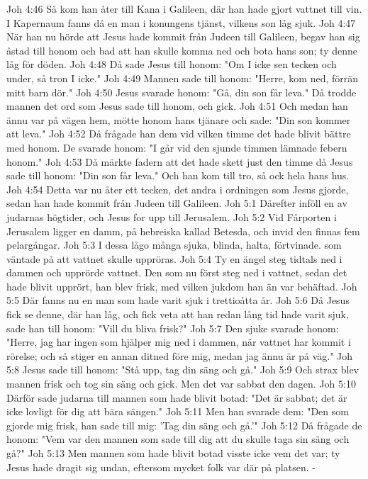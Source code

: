 Joh 4:46  Så kom han åter till Kana i Galileen, där han hade gjort vattnet till vin. I Kapernaum fanns då en man i konungens tjänst, vilkens son låg sjuk.
Joh 4:47  När han nu hörde att Jesus hade kommit från Judeen till Galileen, begav han sig åstad till honom och bad att han skulle komma ned och bota hans son; ty denne låg för döden.
Joh 4:48  Då sade Jesus till honom: "Om I icke sen tecken och under, så tron I icke."
Joh 4:49  Mannen sade till honom: "Herre, kom ned, förrän mitt barn dör."
Joh 4:50  Jesus svarade honom: "Gå, din son får leva." Då trodde mannen det ord som Jesus sade till honom, och gick.
Joh 4:51  Och medan han ännu var på vägen hem, mötte honom hans tjänare och sade: "Din son kommer att leva."
Joh 4:52  Då frågade han dem vid vilken timme det hade blivit bättre med honom. De svarade honom: "I går vid den sjunde timmen lämnade febern honom."
Joh 4:53  Då märkte fadern att det hade skett just den timme då Jesus sade till honom: "Din son får leva." Och han kom till tro, så ock hela hans hus.
Joh 4:54  Detta var nu åter ett tecken, det andra i ordningen som Jesus gjorde, sedan han hade kommit från Judeen till Galileen.
Joh 5:1  Därefter inföll en av judarnas högtider, och Jesus for upp till Jerusalem.
Joh 5:2  Vid Fårporten i Jerusalem ligger en damm, på hebreiska kallad Betesda, och invid den finnas fem pelargångar.
Joh 5:3  I dessa lågo många sjuka, blinda, halta, förtvinade. som väntade på att vattnet skulle uppröras.
Joh 5:4  Ty en ängel steg tidtals ned i dammen och upprörde vattnet. Den som nu först steg ned i vattnet, sedan det hade blivit upprört, han blev frisk, med vilken jukdom han än var behäftad.
Joh 5:5  Där fanns nu en man som hade varit sjuk i trettioåtta år.
Joh 5:6  Då Jesus fick se denne, där han låg, och fick veta att han redan lång tid hade varit sjuk, sade han till honom: "Vill du bliva frisk?"
Joh 5:7  Den sjuke svarade honom: "Herre, jag har ingen som hjälper mig ned i dammen, när vattnet har kommit i rörelse; och så stiger en annan ditned före mig, medan jag ännu är på väg."
Joh 5:8  Jesus sade till honom: "Stå upp, tag din säng och gå."
Joh 5:9  Och strax blev mannen frisk och tog sin säng och gick. Men det var sabbat den dagen.
Joh 5:10  Därför sade judarna till mannen som hade blivit botad: "Det är sabbat; det är icke lovligt för dig att bära sängen."
Joh 5:11  Men han svarade dem: "Den som gjorde mig frisk, han sade till mig: 'Tag din säng och gå.'"
Joh 5:12  Då frågade de honom: "Vem var den mannen som sade till dig att du skulle taga sin säng och gå?"
Joh 5:13  Men mannen som hade blivit botad visste icke vem det var; ty Jesus hade dragit sig undan, eftersom mycket folk var där på platsen. -
